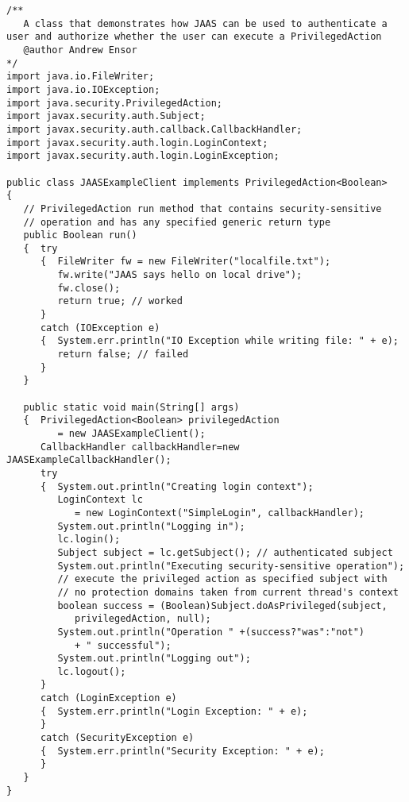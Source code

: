 \begin{lstlisting}[caption=JAAS user authentication]
/**
   A class that demonstrates how JAAS can be used to authenticate a user and authorize whether the user can execute a PrivilegedAction
   @author Andrew Ensor
*/
import java.io.FileWriter;
import java.io.IOException;
import java.security.PrivilegedAction;
import javax.security.auth.Subject;
import javax.security.auth.callback.CallbackHandler;
import javax.security.auth.login.LoginContext;
import javax.security.auth.login.LoginException;

public class JAASExampleClient implements PrivilegedAction<Boolean>
{
   // PrivilegedAction run method that contains security-sensitive
   // operation and has any specified generic return type
   public Boolean run()
   {  try
      {  FileWriter fw = new FileWriter("localfile.txt");
         fw.write("JAAS says hello on local drive");
         fw.close();
         return true; // worked
      }
      catch (IOException e)
      {  System.err.println("IO Exception while writing file: " + e);
         return false; // failed
      }
   }

   public static void main(String[] args)
   {  PrivilegedAction<Boolean> privilegedAction
         = new JAASExampleClient();
      CallbackHandler callbackHandler=new JAASExampleCallbackHandler();
      try
      {  System.out.println("Creating login context");
         LoginContext lc
            = new LoginContext("SimpleLogin", callbackHandler);
         System.out.println("Logging in");
         lc.login();
         Subject subject = lc.getSubject(); // authenticated subject
         System.out.println("Executing security-sensitive operation");
         // execute the privileged action as specified subject with
         // no protection domains taken from current thread's context
         boolean success = (Boolean)Subject.doAsPrivileged(subject,
            privilegedAction, null);
         System.out.println("Operation " +(success?"was":"not")
            + " successful");
         System.out.println("Logging out");
         lc.logout();
      }
      catch (LoginException e)
      {  System.err.println("Login Exception: " + e);
      }
      catch (SecurityException e)
      {  System.err.println("Security Exception: " + e);
      }
   }
}
\end{lstlisting}


